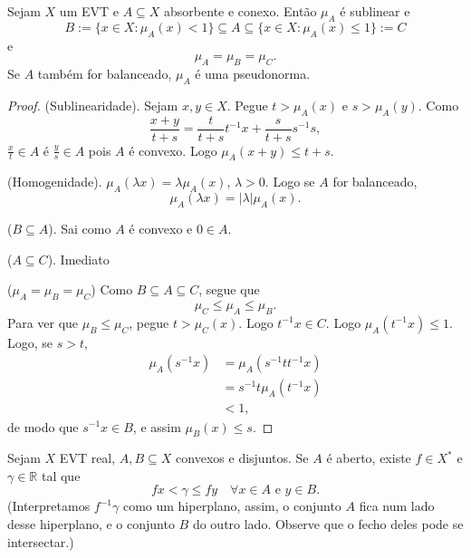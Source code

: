 \documentclass[portuguese]{article}
\theoremstyle{definition}
\newcommand{\R}{\mathbb{R}}
\begin{document}
	\begin{prop}
		Sejam $X$ um EVT e $A\subseteq X$ absorbente e conexo. Então $\mu_A$ é sublinear e
		\[B:=\{x\in X:\mu_A(x)<1\}\subseteq A\subseteq \{x\in X:\mu_A(x)\leq1\}:=C\]
		e
		\[\mu_A=\mu_B=\mu_C.\]
		Se $A$ também for balanceado, $\mu_A$ é uma pseudonorma.
	\end{prop}
	\begin{proof}
		(Sublinearidade). Sejam $x,y\in X$. Pegue $t>\mu_A(x)$ e $s>\mu_A(y)$. Como
		\[\frac{x+y}{t+s}=\frac{t}{t+s}t^{-1}x+\frac{s}{t+s}s^{-1}s,\]
		$\frac{x}{t}\in A$ é $\frac{y}{s}\in A$ pois $A$ é convexo. Logo $\mu_A(x+y)\leq t+s$.
		
		(Homogenidade). $\mu_A(\lambda x)=\lambda\mu_A(x)$, $\lambda>0$. Logo se $A$ for balanceado,
		\[\mu_A(\lambda x)=|\lambda|\mu_A(x).\]
		
		($B\subseteq A$). Sai como $A$ é convexo e $0\in A$.
		
		($A\subseteq C$). Imediato
		
		($\mu_A=\mu_B=\mu_C$) Como $B\subseteq A\subseteq C$, segue que 
		\[\mu_C\leq\mu_A\leq\mu_B.\]
		Para ver que $\mu_B\leq\mu_C$, pegue $t>\mu_C(x)$. Logo $t^{-1}x\in C$. Logo $\mu_A(t^{-1}x)\leq1$. Logo, se $s>t$, 
		\begin{align*}
			\mu_A(s^{-1}x)&=\mu_A(s^{-1}tt^{-1}x)\\
			&=s^{-1}t\mu_A(t^{-1}x)\\
			&<1,
		\end{align*}
		de modo que $s^{-1}x\in B$, e assim $\mu_B(x)\leq s$.
	\end{proof}
	\begin{teo}
		Sejam $X$ EVT real, $A,B\subseteq X$ convexos e disjuntos. Se $A$ é aberto, existe $f\in X^*$ e $\gamma\in\R$ tal que
		\[fx<\gamma\leq fy\quad\forall x\in A\text{ e }y\in B.\]
		(Interpretamos $f^{-1}\gamma$ como um hiperplano, assim, o conjunto $A$ fica num lado desse hiperplano, e o conjunto $B$ do outro lado. Observe que o fecho deles pode se intersectar.)
	\end{teo}
\end{document}
